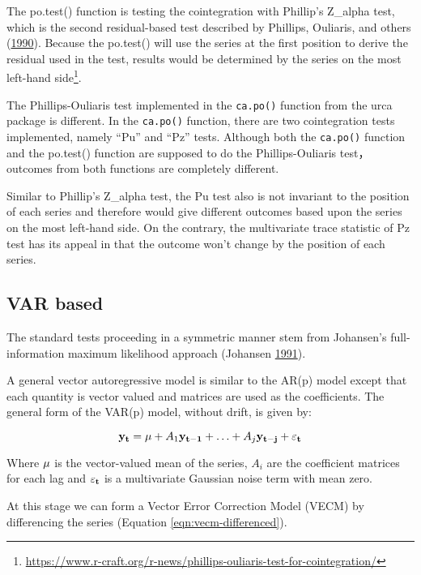 \documentclass[
  12pt,
]{article}
\begin{document}
The po.test() function is testing the cointegration with Phillip's Z\_alpha test, which is the second residual-based test described by Phillips, Ouliaris, and others (\protect\hyperlink{ref-phillips1990asymptotic}{1990}). Because the po.test() will use the series at the first position to derive the residual used in the test, results would be determined by the series on the most left-hand side\footnote{\url{https://www.r-craft.org/r-news/phillips-ouliaris-test-for-cointegration/}}.

The Phillips-Ouliaris test implemented in the \texttt{ca.po()} function from the urca package is different. In the \texttt{ca.po()} function, there are two cointegration tests implemented, namely ``Pu'' and ``Pz'' tests. Although both the \texttt{ca.po()} function and the po.test() function are supposed to do the Phillips-Ouliaris test，outcomes from both functions are completely different.

Similar to Phillip's Z\_alpha test, the Pu test also is not invariant to the position of each series and therefore would give different outcomes based upon the series on the most left-hand side. On the contrary, the multivariate trace statistic of Pz test has its appeal in that the outcome won't change by the position of each series.

\hypertarget{var-based}{%
\subsection{VAR based}\label{var-based}}

The standard tests proceeding in a symmetric manner stem from Johansen's full-information maximum likelihood approach (Johansen \protect\hyperlink{ref-johansen1991estimation}{1991}).

A general vector autoregressive model is similar to the AR(p) model except that each quantity is vector valued and matrices are used as the coefficients. The general form of the VAR(p) model, without drift, is given by:

\begin{equation}
\label{eqn:var-general}
{\bf y_t} = {\bf \mu} + A_1 {\bf y_{t-1}} + \ldots + A_j {\bf y_{t-j}} + {\bf \varepsilon_t} 
\end{equation}

Where \({\bf \mu}\) is the vector-valued mean of the series, \(A_i\) are the coefficient matrices for each lag and \({\bf \varepsilon_t}\) is a multivariate Gaussian noise term with mean zero.

At this stage we can form a Vector Error Correction Model (VECM) by differencing the series (Equation \ref{eqn:vecm-differenced}).
\end{document}
